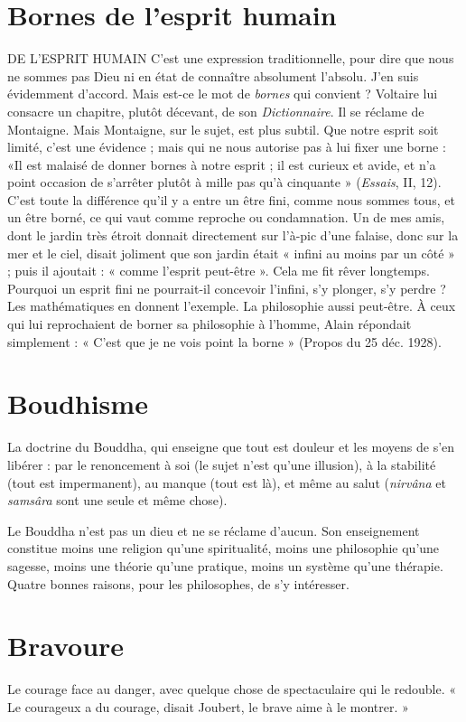 \section{Bornes de l'esprit humain}
DE L'ESPRIT HUMAIN C'est une expression traditionnelle,
pour dire que nous ne sommes pas
Dieu ni en état de connaître absolument l'absolu. J’en suis évidemment
d’accord. Mais est-ce le mot de {\it bornes} qui convient ? Voltaire lui consacre un
chapitre, plutôt décevant, de son {\it Dictionnaire}. Il se réclame de Montaigne.
Mais Montaigne, sur le sujet, est plus subtil. Que notre esprit soit limité, c’est
une évidence ; mais qui ne nous autorise pas à lui fixer une borne : «Il est
malaisé de donner bornes à notre esprit ; il est curieux et avide, et n’a point
occasion de s’arrêter plutôt à mille pas qu’à cinquante » ({\it Essais}, II, 12). C’est
toute la différence qu’il y a entre un être fini, comme nous sommes tous, et un
être borné, ce qui vaut comme reproche ou condamnation. Un de mes amis,
dont le jardin très étroit donnait directement sur l’à-pic d’une falaise, donc sur
la mer et le ciel, disait joliment que son jardin était « infini au moins par un
côté » ; puis il ajoutait : « comme l'esprit peut-être ». Cela me fit rêver longtemps.
Pourquoi un esprit fini ne pourrait-il concevoir l'infini, s’y plonger, s’y
perdre ? Les mathématiques en donnent l’exemple. La philosophie aussi peut-être.
À ceux qui lui reprochaient de borner sa philosophie à l’homme, Alain
répondait simplement : « C’est que je ne vois point la borne » (Propos du
25 déc. 1928).

\section{Boudhisme}
La doctrine du Bouddha, qui enseigne que tout est douleur
et les moyens de s’en libérer : par le renoncement à soi (le
sujet n’est qu’une illusion), à la stabilité (tout est impermanent), au manque
(tout est là), et même au salut ({\it nirvâna} et {\it samsâra} sont une seule et même
chose).

Le Bouddha n’est pas un dieu et ne se réclame d’aucun. Son enseignement
constitue moins une religion qu’une spiritualité, moins une philosophie qu’une
sagesse, moins une théorie qu’une pratique, moins un système qu’une thérapie.
Quatre bonnes raisons, pour les philosophes, de s’y intéresser.

\section{Bravoure}
Le courage face au danger, avec quelque chose de spectaculaire
qui le redouble. « Le courageux a du courage, disait Joubert, le
brave aime à le montrer. »

